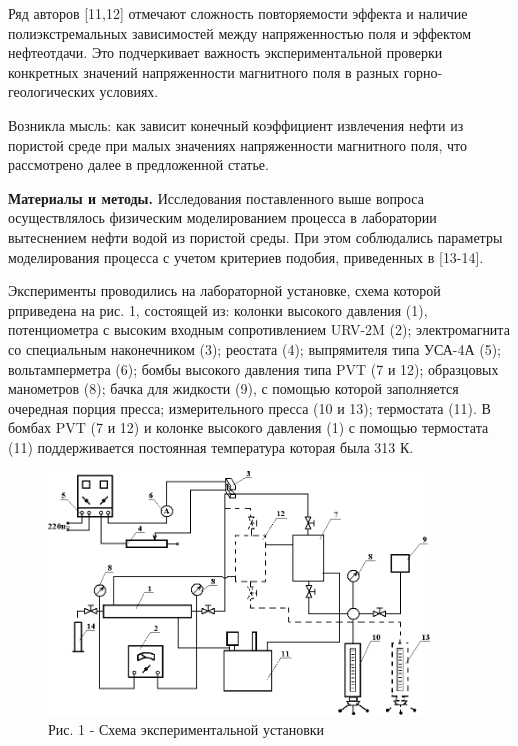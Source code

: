 \begin{multicols}{2}
Ряд авторов {[}11,12{]} отмечают сложность повторяемости эффекта и
наличие полиэкстремальных зависимостей между напряженностью поля и
эффектом нефтеотдачи. Это подчеркивает важность экспериментальной
проверки конкретных значений напряженности магнитного поля в разных
горно-геологических условиях.

Возникла мысль: как зависит конечный коэффициент извлечения нефти из
пористой среде при малых значениях напряженности магнитного поля, что
рассмотрено далее в предложенной статье.

{\bfseries Материалы и методы.} Исследования поставленного выше вопроса
осуществлялось физическим моделированием процесса в лаборатории
вытеснением нефти водой из пористой среды. При этом соблюдались
параметры моделирования процесса с учетом критериев подобия, приведенных
в {[}13-14{]}.

Эксперименты проводились на лабораторной установке, схема которой
рприведена на рис. 1, состоящей из: колонки высокого давления (1),
потенциометра с высоким входным сопротивлением URV-2M (2);
электромагнита со специальным наконечником (3); реостата (4);
выпрямителя типа УСА-4А (5); вольтамперметра (6); бомбы высокого
давления типа PVT (7 и 12); образцовых манометров (8); бачка для
жидкости (9), с помощью которой заполняется очередная порция пресса;
измерительного пресса (10 и 13); термостата (11). В бомбах PVT (7 и 12)
и колонке высокого давления (1) с помощью термостата (11) поддерживается
постоянная температура которая была 313 К.
\end{multicols}

\begin{figure}[H]
	\centering
	\includegraphics[width=0.9\textwidth]{media/gorn4/image2}
	\caption*{Рис. 1 - Схема экспериментальной установки}
\end{figure}


